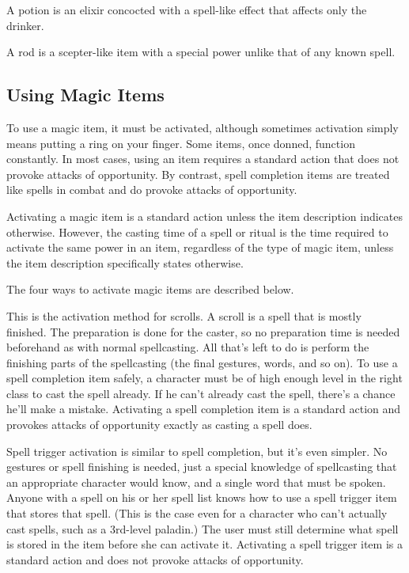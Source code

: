  A potion is an elixir concocted with a spell-like effect that affects only the drinker.

 A rod is a scepter-like item with a special power unlike that of any known spell.

\subsection{Using Magic Items}

To use a magic item, it must be activated, although sometimes activation simply means putting a ring on your finger. Some items, once donned, function constantly. In most cases, using an item requires a standard action that does not provoke attacks of opportunity. By contrast, spell completion items are treated like spells in combat and do provoke attacks of opportunity.

Activating a magic item is a standard action unless the item description indicates otherwise. However, the casting time of a spell or ritual is the time required to activate the same power in an item, regardless of the type of magic item, unless the item description specifically states otherwise.

The four ways to activate magic items are described below.

 This is the activation method for scrolls. A scroll is a spell that is mostly finished. The preparation is done for the caster, so no preparation time is needed beforehand as with normal spellcasting. All that's left to do is perform the finishing parts of the spellcasting (the final gestures, words, and so on). To use a spell completion item safely, a character must be of high enough level in the right class to cast the spell already. If he can't already cast the spell, there's a chance he'll make a mistake. Activating a spell completion item is a standard action and provokes attacks of opportunity exactly as casting a spell does.

 Spell trigger activation is similar to spell completion, but it's even simpler. No gestures or spell finishing is needed, just a special knowledge of spellcasting that an appropriate character would know, and a single word that must be spoken. Anyone with a spell on his or her spell list knows how to use a spell trigger item that stores that spell. (This is the case even for a character who can't actually cast spells, such as a 3rd-level paladin.) The user must still determine what spell is stored in the item before she can activate it. Activating a spell trigger item is a standard action and does not provoke attacks of opportunity.

